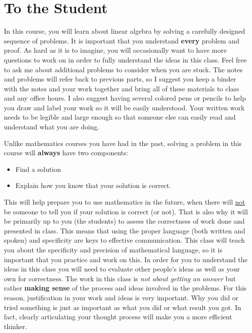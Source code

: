 \chapter{To the Student}

In this course, you will learn about linear algebra by solving a carefully designed sequence of problems.  It is important that you understand \textbf{every} problem and proof. As hard as it is to imagine, you will occasionally want to have more questions to work on in order to fully understand the ideas in this class. Feel free to ask me about additional problems to consider when you are stuck. The notes and problems will refer back to previous parts, so I suggest you keep a binder with the notes and your work together and bring all of these materials to class and any office hours. I also suggest having several colored pens or pencils to help you draw and label your work so it will be easily understood. Your written work needs to be legible and large enough so that someone else can easily read and understand what you are doing.

Unlike mathematics courses you have had in the past, solving a problem in this course will \textbf{always} have two components:
\begin{itemize}
\item Find a solution
\item Explain how you know that your solution is correct.
\end{itemize}
This will help prepare you to use mathematics in the future, when there will \underline{not} be someone to tell you if your solution is correct (or not). That is also why it will be primarily up to you (the students) to assess the correctness of work done and presented in class. This means that using the proper language (both written and spoken) and specificity are keys to effective communication. This class will teach you about the specificity and precision of mathematical language, so it is important that you practice and work on this. In order for you to understand the ideas in this class you will need to evaluate other people's ideas as well as your own for correctness. The work in this class is \emph{not about getting an answer} but rather \textbf{making sense} of the process and ideas involved in the problems. For this reason, justification in your work and ideas is very important. Why you did or tried something is just as important as what you did or what result you got. In fact, clearly articulating your thought process will make you a more efficient thinker.


